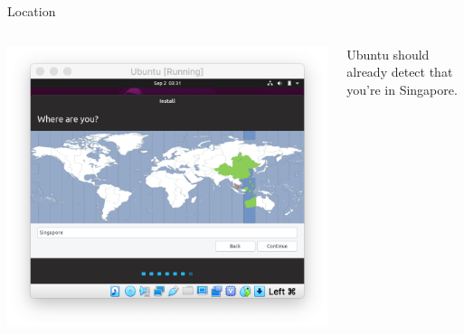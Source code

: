 \documentclass[12pt]{beamer}
\begin{document}
\begin{frame}{Location}
  \begin{columns}
    \begin{column}{0.65\linewidth}
      \includegraphics[width=\linewidth]{ubuntu-tz}
    \end{column}
    \begin{column}{0.35\linewidth}
      Ubuntu should already detect that you're in Singapore.
    \end{column}
  \end{columns}
\end{frame}
\end{document}
